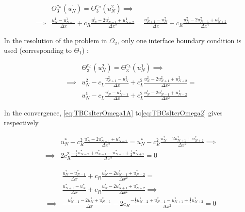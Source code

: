 \begin{equation}
	\begin{aligned}
    \label{eq:TBCsIterOmega1B}
    && 			   & \Theta_3^{c_R}(u_N^1) = \Theta_3^{c_R}(u_N^2) \implies \\
    && \implies & \frac{u_N^1 - u_{N-1}^1}{\Delta x} + c_R \frac{u_N^1 - 2u_{N-1}^1 + u_{N-2}^1}{\Delta x^2} = \frac{u_{N+1}^2 - u_{N}^2}{\Delta x} + c_R \frac{u_N^2 - 2u_{N+1}^2 + u_{N+2}^2}{\Delta x^2}
    \end{aligned}
\end{equation}

\indent In the resolution of the problem in $\Omega_2$, only one interface boundary condition is used (corresponding to $\Theta_1$) :

\begin{equation}
	\begin{aligned}
    \label{eq:TBCsIterOmega2}
    && 				&\Theta_3^{c_L}(u_N^2) = \Theta_3^{c_L}(u_N^1) \implies \\ 
    && \implies & u_N^2 - c_L \frac{u_{N+1}^2 - u_{N}^2}{\Delta x} + c_L^2 \frac{u_N^2 - 2u_{N+1}^2 + u_{N+2}^2}{\Delta x^2}  =\\
    && 				& u_N^1 - c_L \frac{u_{N}^1 - u_{N-1}^1}{\Delta x} + c_L^2 \frac{u_N^1 - 2u_{N-1}^1 + u_{N-2}^1}{\Delta x^2}
    \end{aligned}
\end{equation}

\indent In the convergence, \eqref{eq:TBCsIterOmega1A} to\eqref{eq:TBCsIterOmega2} gives respectively

\begin{equation}
    \label{eq:TBCsCVOmega1A}
\begin{aligned}
    && 			    &u_N^* - c_R^2 \frac{u_N^* - 2u_{N-1}^* + u_{N-2}^*}{\Delta x^2} = u_N^* - c_R^2 \frac{u_N^* - 2u_{N+1}^* + u_{N+2}^*}{\Delta x^2} \implies  \\
    && \implies & 2c_R^2 \frac{-\frac{1}{2}u_{N-2}^* + u_{N-1}^* - u_{N+1}^* + \frac{1}{2}u_{N+2}^* }{\Delta x^2} = 0
    \end{aligned}
    \end{equation}
    
\begin{equation}
    \label{eq:TBCsCVOmega1B}
\begin{aligned}
    &&             &\frac{u_N^* - u_{N-1}^*}{\Delta x} + c_R \frac{u_N^* - 2u_{N-1}^* + u_{N-2}^*}{\Delta x^2} = \\
    && 			   &\frac{u_{N+1}^* - u_{N}^*}{\Delta x} + c_R \frac{u_N^* - 2u_{N+1}^* + u_{N+2}^*}{\Delta x^2} \implies \\
    && \implies & -\frac{u_{N-1}^* - 2 u_{N}^* + u_{N+1}^*}{\Delta x} - 2c_R\frac{-\frac{1}{2}u_{N-2}^* + u_{N-1}^* - u_{N+1}^* + \frac{1}{2}u_{N+2}^* }{\Delta x^2} = 0 
\end{aligned}
\end{equation}

